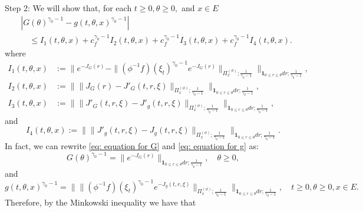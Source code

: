 \documentclass[12pt, a4paper]{amsart}
\theoremstyle{definition}
\numberwithin{equation}{section}
\begin{document}
	Step 2: We will show that, for each $t\geq 0, \theta \geq 0,$ and $x\in E$
\[\begin{split}
	&|  G(\theta)^{\gamma_0 - 1} - g(t,\theta,x)^{\gamma_0 - 1} |
	\\&\quad \leq I_1(t,\theta,x) +c^{\gamma_0 - 1}_f I_2(t,\theta,x) +c^{\gamma_0 - 1}_f I_3(t,\theta,x) + c^{\gamma_0 - 1}_f I_4(t,\theta,x).
\end{split}\]
	where
\[\begin{split}
	I_1(t,\theta,x)
	&:= \Big\| e^{ - J_G(r)} - \| (\phi^{-1}f)(\xi_t)^{\gamma_0 - 1} e^{-J_G(r)} \|_{\Pi_x^{(\phi)};\frac{1}{\gamma_0 - 1}} \Big\|_{\mathbf 1_{0\leq r\leq \theta} dr;\frac{1}{\gamma_0 - 1}} ,
	\\I_2(t,\theta,x)
	&:= \Big\|  \|  J_G(r) - J'_G(t,r,\xi)  \|_{\Pi_x^{(\phi)};\frac{1}{\gamma_0 - 1}} \Big\|_{\mathbf 1_{0\leq r\leq \theta} dr;\frac{1}{\gamma_0 - 1}},
	\\I_3(t,\theta,x)
	&:= \Big\| \|  J'_G(t,r,\xi) - J'_g(t,r,\xi)  \|_{\Pi_x^{(\phi)};\frac{1}{\gamma_0 - 1}} \Big\|_{\mathbf 1_{0\leq r\leq \theta} dr;\frac{1}{\gamma_0 - 1}},
\end{split}\]
	and
\[
	I_4(t,\theta,x)
	:= \Big\| \| J'_g(t,r,\xi) - J_g(t,r,\xi)  \|_{\Pi_x^{(\phi)};\frac{1}{\gamma_0 - 1}} \Big\|_{\mathbf 1_{0\leq r\leq \theta} dr;\frac{1}{\gamma_0 - 1}}.
\]
	In fact, we can rewrite \eqref{eq: equation for G} and \eqref{eq: equation for g} as:
\[
	G(\theta)^{\gamma_0 - 1} =
	\| e^{ - J_G(r)} \|_{\mathbf 1_{0\leq r\leq \theta} dr;\frac{1}{\gamma_0 - 1}},
	\quad \theta \geq 0,
\]	
	and
\[
	g(t,\theta,x)^{\gamma_0 - 1}
	=\Big\| \| (\phi^{-1}f)(\xi_t) ^{\gamma_0 - 1} e^{-J_g(t,r,\xi)} \|_{\Pi_x^{(\phi)};\frac{1}{\gamma_0 - 1}} \Big\|_{\mathbf 1_{0\leq r\leq \theta} dr;\frac{1}{\gamma_0 - 1}},
	\quad t\geq 0, \theta \geq 0, x\in E.
\]
	Therefore, by the Minkowski inequality we have that
\end{document}
